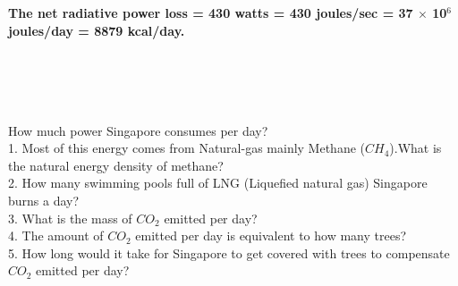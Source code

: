 \documentclass[11pt]{exam}
\begin{document}
\begin{questions}
{\begin{minipage}{42em}
                      \textbf{The net radiative power loss = 430 watts = 430 joules/sec  = 37 $\times$ 10$^{6}$ joules/day = 8879 kcal/day.}
                      
                                       
\end{minipage}} \\ \\ \\ \\


\question
\label{Q21: Power consumption per day by Singapore}
How much power Singapore consumes per day? \\ 
1. Most of this energy comes from Natural-gas mainly Methane ($CH_{4}$).What is the natural energy density of methane? \\
2. How many swimming pools full of LNG (Liquefied natural gas) Singapore burns a day? \\
3. What is the mass of $CO_{2}$ emitted per day? \\
4. The amount of $CO_{2}$ emitted per day is equivalent to how many trees? \\
5. How long would it take for Singapore to get covered with trees to compensate $CO_{2}$ emitted per day? \\ \\



\end{questions}
\end{document}
